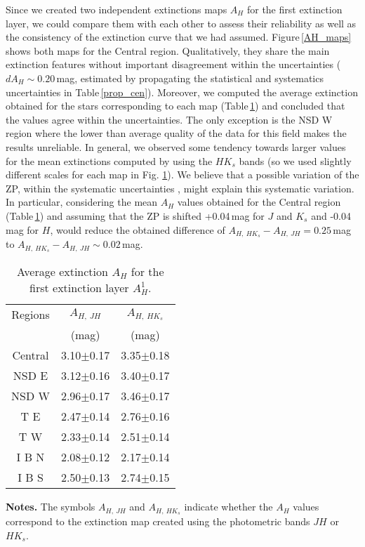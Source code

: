\documentclass{aa}
\begin{document}
Since we created two independent extinctions maps $A_H$ for the first extinction layer, we could compare them with each other to assess their reliability as well as the consistency of the extinction curve that we had assumed. Figure\,\ref{AH_maps} shows both maps for the Central region.  Qualitatively, they share the main extinction features without important disagreement within the uncertainties ($dA_H\sim 0.20$\,mag, estimated by propagating the statistical and systematics uncertainties in Table\,\ref{prop_cen}). Moreover, we computed the average extinction obtained for the stars corresponding to each map (Table\,\ref{diff_ext_layers}) and concluded that the values agree within the uncertainties. The only exception is the NSD W region where the lower than average quality of the data for this field \citep[see Table A.3. in][]{Nogueras-Lara:2019aa} makes the results unreliable. In general, we observed some tendency towards larger values for the mean extinctions computed by using the $HK_s$ bands (so we used slightly different scales for each map in Fig. \ref{diff_ext_layers}). We believe that a possible variation of the ZP, within the systematic uncertainties \citep[$\sim0.04$\,mag in all three bands,][]{Nogueras-Lara:2019aa}, might explain this systematic variation. In particular, considering the mean $A_H$ values obtained for the Central region (Table\,\ref{diff_ext_layers}) and assuming that the ZP is shifted +0.04\,mag for $J$ and $K_s$ and -0.04\,mag for $H$, would reduce the obtained difference of $A_{H,\ HK_s}-A_{H,\ JH}=0.25$\,mag to $A_{H,\ HK_s}-A_{H,\ JH}\sim0.02$\,mag.




\begin{table}[t!]
\caption{Average extinction $A_H$ for the first extinction layer $A_H^1$.}
\label{diff_ext_layers} 
\begin{center}
\def\arraystretch{1.4}
\setlength{\tabcolsep}{3.8pt}
\begin{tabular}{ccc}
 &  & \tabularnewline
\hline 
\hline 
Regions & $A_{H,\ JH}$ & $A_{H,\ HK_s}$\tabularnewline
 & (mag) & (mag) \tabularnewline
\hline 
Central & 3.10$\pm$0.17 & 3.35$\pm$0.18\tabularnewline
NSD E & 3.12$\pm$0.16 & 3.40$\pm$0.17\tabularnewline
NSD W & 2.96$\pm$0.17 & 3.46$\pm$0.17\tabularnewline
T E & 2.47$\pm$0.14 & 2.76$\pm$0.16\tabularnewline
T W & 2.33$\pm$0.14 & 2.51$\pm$0.14\tabularnewline
I B N & 2.08$\pm$0.12 & 2.17$\pm$0.14\tabularnewline
I B S & 2.50$\pm$0.13 & 2.74$\pm$0.15\tabularnewline
\hline 
\end{tabular}

\end{center}
\footnotesize
\textbf{Notes.} The symbols $A_{H,\ JH}$ and $A_{H,\ HK_s}$ indicate whether the $A_H$ values correspond to the extinction map created using the photometric bands $JH$ or $HK_s$. 

 \end{table}
\end{document}
